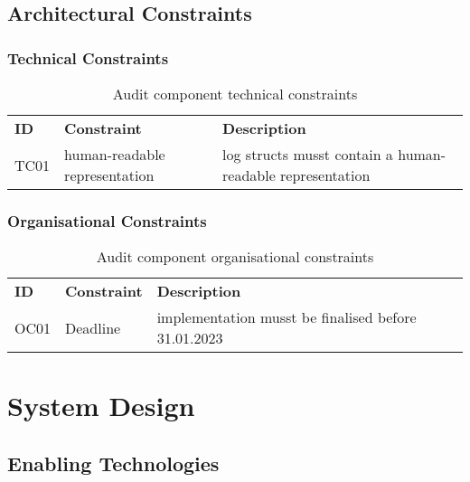\subsection{Architectural Constraints}

\subsubsection{Technical Constraints}

\begin{table}[h!]
  \begin{center}
    \caption{Audit component technical constraints}
    \label{tab:actc}
    \def\arraystretch{1.5}
    \begin{tabularx}{\linewidth}{|l l X |}
      \hline
      \rowcolor{gray!20}
      \textbf{ID} & \textbf{Constraint} & \textbf{Description}\\
      TC01 & human-readable representation & log structs musst contain a human-readable representation\\
      \hline
    \end{tabularx}
  \end{center}
\end{table}

\subsubsection{Organisational Constraints}

\begin{table}[h!]
  \begin{center}
    \caption{Audit component organisational constraints}
    \label{tab:acoc}
    \def\arraystretch{1.5}
    \begin{tabularx}{\linewidth}{|l l X |}
      \hline
      \rowcolor{gray!20}
      \textbf{ID} & \textbf{Constraint} & \textbf{Description}\\
      OC01 & Deadline & implementation musst be finalised before 31.01.2023\\
      \hline
    \end{tabularx}
  \end{center}
\end{table}

\section{System Design}

\subsection{Enabling Technologies}

